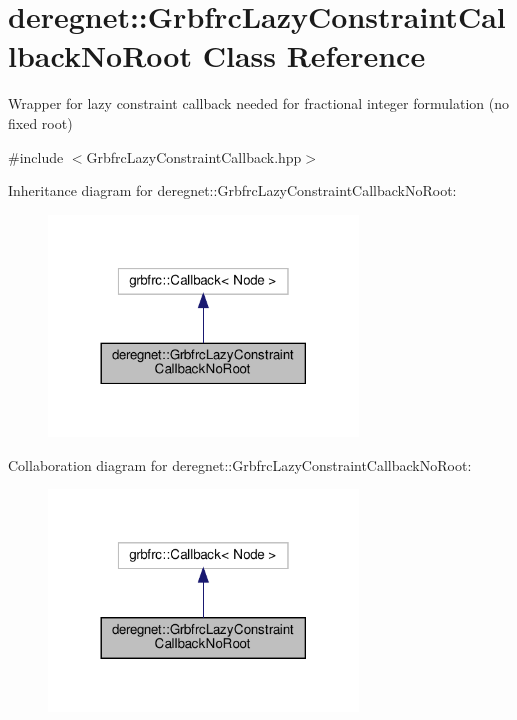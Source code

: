 \hypertarget{classderegnet_1_1GrbfrcLazyConstraintCallbackNoRoot}{}\section{deregnet\+:\+:Grbfrc\+Lazy\+Constraint\+Callback\+No\+Root Class Reference}
\label{classderegnet_1_1GrbfrcLazyConstraintCallbackNoRoot}


Wrapper for lazy constraint callback needed for fractional integer formulation (no fixed root)  




{\ttfamily \#include $<$Grbfrc\+Lazy\+Constraint\+Callback.\+hpp$>$}



Inheritance diagram for deregnet\+:\+:Grbfrc\+Lazy\+Constraint\+Callback\+No\+Root\+:\nopagebreak
\begin{figure}[H]
\begin{center}
\leavevmode
\includegraphics[width=233pt]{classderegnet_1_1GrbfrcLazyConstraintCallbackNoRoot__inherit__graph}
\end{center}
\end{figure}


Collaboration diagram for deregnet\+:\+:Grbfrc\+Lazy\+Constraint\+Callback\+No\+Root\+:\nopagebreak
\begin{figure}[H]
\begin{center}
\leavevmode
\includegraphics[width=233pt]{classderegnet_1_1GrbfrcLazyConstraintCallbackNoRoot__coll__graph}
\end{center}
\end{figure}
